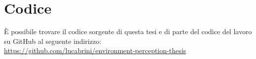 \chapter{Codice}
È possibile trovare il codice sorgente di questa tesi e di parte del codice del lavoro su GitHub al seguente indirizzo:\\
\url{https://github.com/lucabrini/environment-perception-thesis}